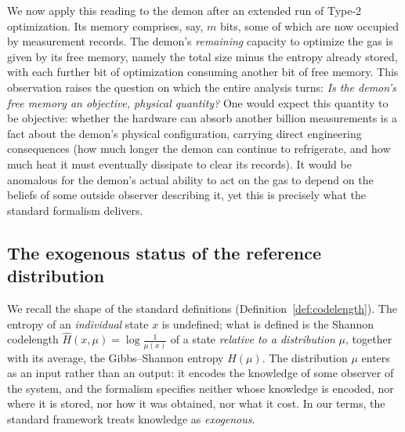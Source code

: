 \documentclass[10pt]{article}
\theoremstyle{definition}
\theoremstyle{remark}
\begin{document}
We now apply this reading to the demon after an extended run of Type-2 optimization. Its memory comprises, say, $m$ bits, some of which are now occupied by measurement records. The demon's \emph{remaining} capacity to optimize the gas is given by its free memory, namely the total size minus the entropy already stored, with each further bit of optimization consuming another bit of free memory. This observation raises the question on which the entire analysis turns: \emph{Is the demon's free memory an objective, physical quantity?} One would expect this quantity to be objective: whether the hardware can absorb another billion measurements is a fact about the demon's physical configuration, carrying direct engineering consequences (how much longer the demon can continue to refrigerate, and how much heat it must eventually dissipate to clear its records). It would be anomalous for the demon's actual ability to act on the gas to depend on the beliefs of some outside observer describing it, yet this is precisely what the standard formalism delivers.

\subsection{The exogenous status of the reference distribution}
\label{sec:exogenous}

We recall the shape of the standard definitions (Definition~\ref{def:codelength}). The entropy of an \emph{individual} state $x$ is undefined; what is defined is the Shannon codelength $\hat H(x, \mu) = \log \frac{1}{\mu(x)}$ of a state \emph{relative to a distribution} $\mu$, together with its average, the Gibbs--Shannon entropy $H(\mu)$. The distribution $\mu$ enters as an input rather than an output: it encodes the knowledge of some observer of the system, and the formalism specifies neither whose knowledge is encoded, nor where it is stored, nor how it was obtained, nor what it cost. In our terms, the standard framework treats knowledge as \emph{exogenous}.
\end{document}
